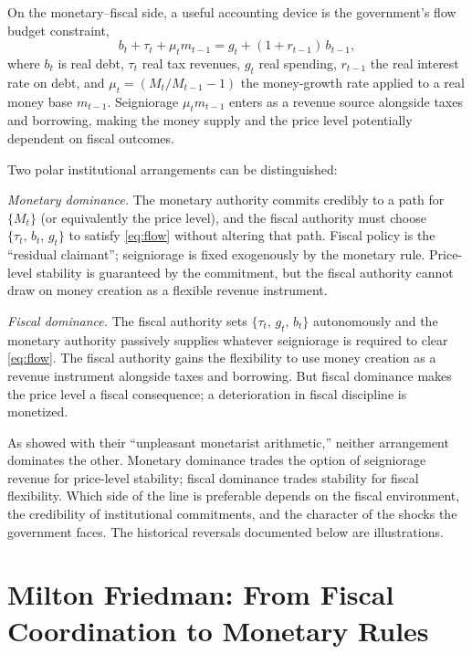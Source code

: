 \documentclass[12pt]{article}
\begin{document}
On the monetary--fiscal side, a useful accounting device is the government's
flow budget constraint,
\begin{equation}
\label{eq:flow}
b_t + \tau_t + \mu_t m_{t-1} = g_t + (1+r_{t-1})\,b_{t-1},
\end{equation}
where $b_t$ is real debt, $\tau_t$ real tax revenues, $g_t$ real spending,
$r_{t-1}$ the real interest rate on debt, and $\mu_t = (M_t/M_{t-1}-1)$
the money-growth rate applied to a real money base $m_{t-1}$.  Seigniorage
$\mu_t m_{t-1}$ enters as a revenue source alongside taxes and borrowing,
making the money supply and the price level potentially dependent on fiscal
outcomes.

Two polar institutional arrangements can be distinguished:

\textit{Monetary dominance.}  The monetary authority commits credibly to
a path for $\{M_t\}$ (or equivalently the price level), and the fiscal
authority must choose $\{\tau_t,\, b_t,\, g_t\}$ to satisfy
\eqref{eq:flow} without altering that path.  Fiscal policy is the
``residual claimant''; seigniorage is fixed exogenously by the monetary
rule.  Price-level stability is guaranteed by the commitment, but the
fiscal authority cannot draw on money creation as a flexible revenue
instrument.

\textit{Fiscal dominance.}  The fiscal authority sets
$\{\tau_t,\, g_t,\, b_t\}$ autonomously and the monetary authority
passively supplies whatever seigniorage is required to clear
\eqref{eq:flow}.  The fiscal authority gains the flexibility to use money
creation as a revenue instrument alongside taxes and borrowing.  But
fiscal dominance makes the price level a fiscal consequence; a
deterioration in fiscal discipline is monetized.

As \citet{SargentWallace1981} showed with their ``unpleasant monetarist
arithmetic,'' neither arrangement dominates the other.  Monetary dominance
trades the option of seigniorage revenue for price-level stability;
fiscal dominance trades stability for fiscal flexibility.  Which side of
the line is preferable depends on the fiscal environment, the credibility
of institutional commitments, and the character of the shocks the
government faces.  The historical reversals documented below are
illustrations.


\section{Milton Friedman: From Fiscal Coordination to Monetary Rules}
\end{document}
